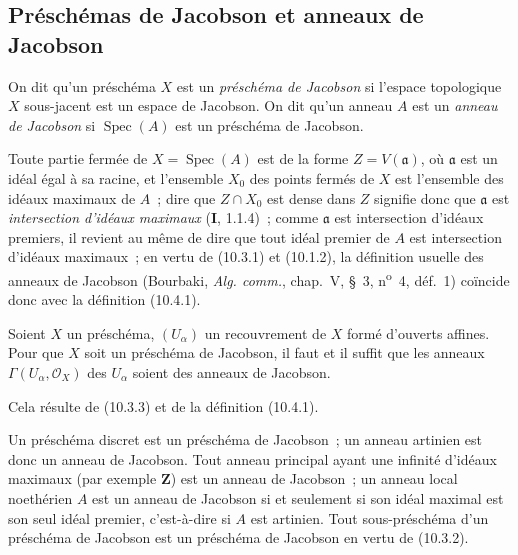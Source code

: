 \subsection{Préschémas de Jacobson et anneaux de Jacobson}

\begin{definition}[10.4.1]
\label{IV.10.4.1-fr}
On dit qu'un préschéma $X$ est un \emph{préschéma de Jacobson} si l'espace
topologique $X$ sous-jacent est un espace de Jacobson. On dit qu'un anneau
$A$ est un \emph{anneau de Jacobson} si $\operatorname{Spec}(A)$ est un
préschéma de Jacobson.
\end{definition}

Toute partie fermée de $X=\operatorname{Spec}(A)$ est de la forme
$Z=V(\mathfrak a)$, où $\mathfrak a$ est un idéal égal à sa racine, et
l'ensemble $X_0$ des points fermés de $X$ est l'ensemble des idéaux maximaux
de $A$~; dire que $Z\cap X_0$ est dense dans $Z$ signifie donc que
$\mathfrak a$ est \emph{intersection d'idéaux maximaux} (\textbf{I}, 1.1.4)~;
comme $\mathfrak a$ est intersection d'idéaux premiers, il revient au même de
dire que tout idéal premier de $A$ est intersection d'idéaux maximaux~; en
vertu de (10.3.1) et (10.1.2), la définition usuelle des anneaux de Jacobson
(Bourbaki, \emph{Alg. comm.}, chap.~V, \S~3, n\textsuperscript{o}~4, déf.~1)
coïncide donc avec la définition (10.4.1).

\begin{proposition}[10.4.2]
\label{IV.10.4.2-fr}
Soient $X$ un préschéma, $(U_\alpha)$ un recouvrement de $X$ formé d'ouverts
affines. Pour que $X$ soit un préschéma de Jacobson, il faut et il suffit que
les anneaux $\Gamma(U_\alpha,\mathcal O_X)$ des $U_\alpha$ soient des anneaux
de Jacobson.
\end{proposition}

Cela résulte de (10.3.3) et de la définition (10.4.1).

\begin{env}[10.4.3]
\label{IV.10.4.3-fr}
Un préschéma discret est un préschéma de Jacobson~; un anneau artinien est donc
un anneau de Jacobson. Tout anneau principal ayant une infinité d'idéaux
maximaux (par exemple $\mathbf Z$) est un anneau de Jacobson~; un anneau local
noethérien $A$ est un anneau de Jacobson si et seulement si son idéal maximal
est son seul idéal premier, c'est-à-dire si $A$ est artinien. Tout
sous-préschéma d'un préschéma de Jacobson est un préschéma de Jacobson en vertu
de (10.3.2).
\end{env}

